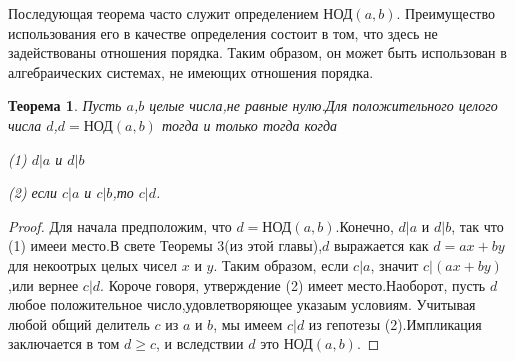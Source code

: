 \documentclass[11pt]{article}
\newtheorem{theorem}{Теорема}
\begin{document}
Последующая теорема часто служит определением $\text{НОД}(a,b)$. Преимущество использования его в качестве определения состоит в том, что здесь не задействованы отношения порядка. Таким образом, он может быть использован в алгебраических системах, не имеющих отношения порядка. 

\begin{theorem}
	Пусть $a$,$b$ целые числа,не равные нулю.Для положительного целого числа $d$,$d=\text{НОД}(a,b)$ тогда и только тогда когда
\begin{enumerate}
		(1) $d|a$ и $d|b$
\end{enumerate}
\begin{enumerate}
	    (2) если $c|a$ и $c|b$,то $c|d$.
\end{enumerate}
\end{theorem}
\begin{proof}
	Для начала предположим, что $d=\text{НОД}(a,b)$.Конечно, $d|a$ и $d|b$, так что (1) имееи место.В свете Теоремы 3(из этой главы),$d$ выражается как $d=ax+by$ для некоотрых целых чисел $x$ и $y$.
	Таким образом, если $c|a$, значит $c|(ax+by)$,или вернее $c|d$.
	Короче говоря, утверждение (2) имеет место.Наоборот, пусть $d$ любое положительное число,удовлетворяющее указаым условиям.
	Учитывая любой общий делитель $c$ из $a$ и $b$, мы имеем $c|d$ из гепотезы (2).Импликация заключается в том $d \ge c$, и вследствии $d$ это $\text{НОД}(a,b)$.
\end{proof}
\end{document}
